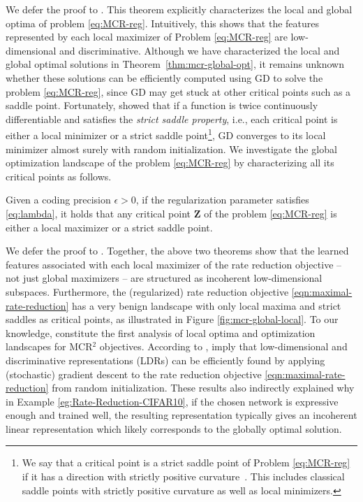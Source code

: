 \documentclass[../../book-main.tex]{subfiles}
\begin{document}
We defer the proof to \cite{wang2024global}. This theorem explicitly characterizes the local and global optima of problem \eqref{eq:MCR-reg}. Intuitively, this shows that the features represented by each local maximizer of Problem \eqref{eq:MCR-reg} are low-dimensional and discriminative. Although we have characterized the local and global optimal solutions in Theorem~\ref{thm:mcr-global-opt}, it remains unknown whether these solutions can be efficiently computed using GD to solve the problem \eqref{eq:MCR-reg}, since GD may get stuck at other critical points such as a saddle point.
Fortunately, \cite{sun2015nonconvex,lee2016gradient} showed that if a function is twice continuously differentiable and satisfies the {\em strict saddle property}, i.e., each critical point is either a local minimizer or a strict saddle point\footnote{We say that a critical point is a strict saddle point of Problem \eqref{eq:MCR-reg} if it has a direction with strictly positive curvature~\cite{sun2015nonconvex}. This includes classical saddle points with strictly positive curvature as well as local minimizers.}, GD converges to its local minimizer almost surely with random initialization. We investigate the global optimization landscape of the problem \eqref{eq:MCR-reg} by characterizing all its critical points as follows.

 \begin{theorem}\label{thm:mcr-benign-opt-landscape}
	Given a coding precision $\epsilon > 0$, if the regularization parameter satisfies \eqref{eq:lambda},
	it holds that any critical point $\bm Z$ of the problem \eqref{eq:MCR-reg} is either a local maximizer or a strict saddle point.
\end{theorem}
We defer the proof to \cite{wang2024global}.  Together, the above two theorems show that the learned features associated with each local maximizer of the rate reduction objective -- not just global maximizers -- are structured as incoherent low-dimensional subspaces. Furthermore, the (regularized) rate reduction objective \eqref{eqn:maximal-rate-reduction} has a very benign landscape with only local maxima and strict saddles as critical points, as illustrated in Figure \ref{fig:mcr-global-local}. To our knowledge,  constitute the first analysis of local optima and optimization landscapes for MCR$^2$ objectives. According to \cite{sun2015nonconvex,lee2016gradient},  imply that low-dimensional and discriminative representations (LDRs) can be efficiently found by applying (stochastic) gradient descent to the rate reduction objective \eqref{eqn:maximal-rate-reduction} from random initialization. These results also indirectly explained why in Example \ref{eg:Rate-Reduction-CIFAR10}, if the chosen network is expressive enough and trained well, the resulting representation typically gives an incoherent linear representation which likely corresponds to the globally optimal solution.
\end{document}
